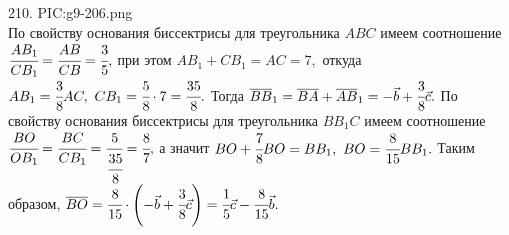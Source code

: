 210. {{PIC:g9-206.png}}\\
По свойству основания биссектрисы для треугольника $ABC$ имеем соотношение
$\cfrac{AB_1}{CB_1}=\cfrac{AB}{CB}=\cfrac{3}{5},$ при этом $AB_1+CB_1=AC=7,$ откуда $AB_1=\cfrac{3}{8}AC,\ CB_1=\cfrac{5}{8}\cdot7=\cfrac{35}{8}.$ Тогда $\overline{BB}_1=\overline{BA}+\overline{AB}_1=-\vec{b}+\cfrac{3}{8}\vec{c}.$
По свойству основания биссектрисы для треугольника $BB_1C$ имеем соотношение
$\cfrac{BO}{OB_1}=\cfrac{BC}{CB_1}=\cfrac{5}{\cfrac{35}{8}}=\cfrac{8}{7},$ а значит $BO+\cfrac{7}{8}BO=BB_1,\ BO=\cfrac{8}{15}BB_1.$ Таким образом, $\overline{BO}=\cfrac{8}{15}\cdot\left(-\vec{b}+\cfrac{3}{8}\vec{c}\right)=
\cfrac{1}{5}\vec{c}-\cfrac{8}{15}\vec{b}.$\\
